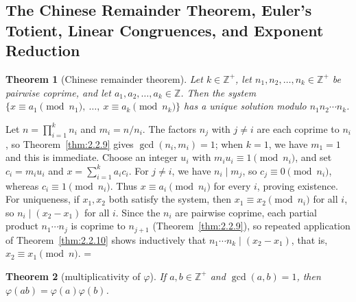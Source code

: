 \documentclass[11pt]{article}
\makeatletter
\let\nt@closedisplay\]
\def\nt@guardedclose{\@ifnextchar\par{\nt@closeafterpar}{\@ifnextchar\end{\postdisplaypenalty\@M\nt@closedisplay}{\nt@closedisplay}}}
\def\nt@closeafterpar\par{\@ifnextchar\par{\nt@closeafterpar}{\@ifnextchar\end{\postdisplaypenalty\@M\nt@closedisplay\par}{\nt@closedisplay\par}}}
\renewenvironment{proof}[1][\proofname]{\par
  \pushQED{\qed}\normalfont\topsep\medskipamount\edef\nt@afterproof{\@endparpenalty=\the\@endparpenalty\relax}\@beginparpenalty\@M\@endparpenalty\@M\let\]\nt@guardedclose\trivlist\item[]\textit{#1\@addpunct{.}} \ignorespaces}{\ifvmode\addpenalty\@M\fi\popQED\nt@afterproof\endtrivlist\@endpefalse}
\theoremstyle{ntstyle}
\newtheorem{theorem}{Theorem}[subsection]
\makeatother
\begin{document}
\subsection{The Chinese Remainder Theorem, Euler's Totient, Linear Congruences, and Exponent Reduction}

\begin{theorem}[Chinese remainder theorem]\label{thm:3.4.1}\label{thm:chinese-remainder-theorem}
  Let
  $k\in\mathbb{Z}^+$, let $n_1, n_2, \ldots, n_k \in \mathbb{Z}^+$ be
  pairwise coprime, and let $a_1, a_2, \ldots, a_k \in \mathbb{Z}$. Then
  the system $\{x \equiv a_1 \pmod{n_1},\ \ldots,\ x \equiv a_k \pmod{n_k}\}$ has
  a unique solution modulo $n_1 n_2 \cdots n_k$.

\end{theorem}

\begin{proof} Let $n = \prod_{i=1}^{k} n_i$ and $m_i=n/n_i$.
  The factors $n_j$ with $j\neq i$ are each coprime to $n_i$, so
  Theorem~\ref{thm:2.2.9} gives $\gcd(n_i,m_i)=1$; when $k=1$,
  we have $m_1=1$ and this is immediate. Choose an integer $u_i$ with
  $m_i u_i\equiv1\pmod{n_i}$, and set $c_i=m_i u_i$ and
  $x=\sum_{i=1}^{k}a_i c_i$. For $j\neq i$, we have $n_i\mid m_j$, so
  $c_j\equiv0\pmod{n_i}$, whereas $c_i\equiv1\pmod{n_i}$.
  Thus $x\equiv a_i\pmod{n_i}$ for every $i$, proving existence. For
  uniqueness, if $x_1, x_2$ both satisfy the system, then $x_1 \equiv x_2 \pmod{n_i}$ for all $i$, so
  $n_i \mid (x_2 - x_1)$ for all
  $i$. Since the $n_i$ are pairwise coprime, each partial product
  $n_1\cdots n_j$ is coprime to $n_{j+1}$ (Theorem~\ref{thm:2.2.9}), so repeated application of
  Theorem~\ref{thm:2.2.10} shows inductively that $n_1\cdots n_k\mid(x_2-x_1)$, that is,
  $x_2 \equiv x_1 \pmod{n}$.
\end{proof}

\begin{theorem}[multiplicativity of $\varphi$]\label{thm:3.4.2}\label{thm:multiplicativity-of-phi}
  If $a, b \in \mathbb{Z}^+$
  and $\gcd(a, b) = 1$, then $\varphi(ab) = \varphi(a)\varphi(b)$.

\end{theorem}
\end{document}
